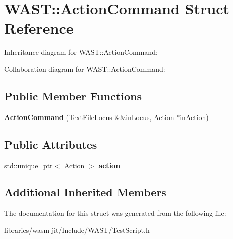 \hypertarget{struct_w_a_s_t_1_1_action_command}{}\section{W\+A\+ST\+:\+:Action\+Command Struct Reference}
\label{struct_w_a_s_t_1_1_action_command}


Inheritance diagram for W\+A\+ST\+:\+:Action\+Command\+:


Collaboration diagram for W\+A\+ST\+:\+:Action\+Command\+:
\subsection*{Public Member Functions}
\begin{DoxyCompactItemize}
\item 
\mbox{\label{struct_w_a_s_t_1_1_action_command_acd1b0c20c7e0f04fa35fa306a8260353}} 
{\bfseries Action\+Command} (\mbox{\hyperlink{struct_w_a_s_t_1_1_text_file_locus}{Text\+File\+Locus}} \&\&in\+Locus, \mbox{\hyperlink{struct_w_a_s_t_1_1_action}{Action}} $\ast$in\+Action)
\end{DoxyCompactItemize}
\subsection*{Public Attributes}
\begin{DoxyCompactItemize}
\item 
\mbox{\label{struct_w_a_s_t_1_1_action_command_a014107d91f9588f1c52cc015ff8be8b6}} 
std\+::unique\+\_\+ptr$<$ \mbox{\hyperlink{struct_w_a_s_t_1_1_action}{Action}} $>$ {\bfseries action}
\end{DoxyCompactItemize}
\subsection*{Additional Inherited Members}


The documentation for this struct was generated from the following file\+:\begin{DoxyCompactItemize}
\item 
libraries/wasm-\/jit/\+Include/\+W\+A\+S\+T/Test\+Script.\+h\end{DoxyCompactItemize}
